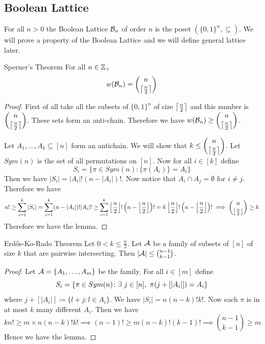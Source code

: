 \documentclass[twoside]{article}
\begin{document}
\subsection{Boolean Lattice}
For all $n>0$ the Boolean Lattice $\mathcal{B}_n$ of order $n$ is the poset $(\{0,1\}^n,\subseteq)$. We will prove a property of the Boolean Lattice and we will define general lattice later.
\begin{Theorem}{Sperner's Theorem}{}
	For all $n\in \mathbb{Z}_+$ $$w(\mathcal{B}_n)=\binom{n}{\left\lceil\frac{n}2\right\rceil}$$
\end{Theorem}
\begin{proof}
	First of all take all the subsets of $\{0,1\}^n$ of size $\left\lceil\frac{n}2\right\rceil$ and this number is $\displaystyle{\binom{n}{\left\lceil\frac{n}2\right\rceil}}$. These sets form an anti-chain. Therefore we have $w(\mathcal{B}_n)\geq \displaystyle{\binom{n}{\left\lceil\frac{n}2\right\rceil}}$.
	
	Let $A_1,\dots, A_k\subseteq [n]$ form an antichain. We will show that $k\leq \displaystyle{\binom{n}{\left\lceil\frac{n}2\right\rceil}}$.	Let $Sym(n)$ is the set of all permutations on $[n]$. Now for all $i\in[k]$ define $$S_i=\{\pi\in Sym(n)\colon \{\pi(A_i)\}=A_i\}$$Then we have $|S_i|=|A_i|!(n-|A_i|)!$. Now notice that $A_i\cap A_j=\emptyset$ for $i\neq j$. Therefore we have $$n!\geq\sum_{i=1}^k|S_i|=\sum_{i=1}^k(n-|A_i|)!|A_i|!\geq \sum_{i=1}^k\left\lfloor\frac{n}2\right\rfloor!\left(n-\left\lfloor\frac{n}2\right\rfloor\right)!=k\left\lfloor\frac{n}2\right\rfloor!\left(n-\left\lfloor\frac{n}2\right\rfloor\right)!\implies \binom{n}{\left\lfloor\frac{n}2\right\rfloor}\geq k$$Therefore we have the lemma.
\end{proof}
\begin{Theorem}{Erd\H{o}s-Ko-Rado Theorem}{}
	Let $0<k\leq \frac{n}{2}$. Let $\mathcal{A}$ be a family of   subsets of $[n]$ of size $k$ that are pairwise intersecting. Then $|\mathcal{A}|\leq \binom{n-1}{k-1}$.
\end{Theorem}
\begin{proof}
	Let $\mathcal{A}=\{A_1,\dots, A_m\}$ be the family. For all $i\in[m]$ define $$S_i=\{\pi\in Sym(n)\colon \exs\ j\in[n],\ \pi(j+[|A_i|])=A_i\}$$where $j+[|A_i|]\coloneqq \{l+j\colon l\in A_i\}$. We have $|S_i|=n(n-k)!k!$. Now each $\pi$ is in at most $k$ many different $A_i$. Then we have $$kn!\geq m\times n(n-k)!k!\implies (n-1)!\geq m(n-k)!(k-1)!\implies \binom{n-1}{k-1}\geq m$$Hence we have the lemma.
\end{proof}
\end{document}
